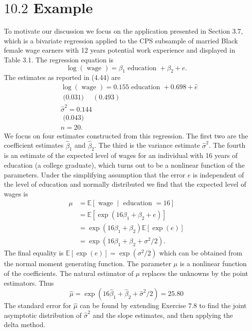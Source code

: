 \documentclass[10pt]{article}
\begin{document}
\section{$10.2$ Example}
To motivate our discussion we focus on the application presented in Section 3.7, which is a bivariate regression applied to the CPS subsample of married Black female wage earners with 12 years potential work experience and displayed in Table 3.1. The regression equation is
$$
\log (\text { wage })=\beta_{1} \text { education }+\beta_{2}+e .
$$
The estimates as reported in (4.44) are
$$
\begin{aligned}
& \log (\text { wage })=0.155 \text { education }+0.698+\widehat{e} \\
& \text { (0.031) } \quad(0.493) \\
& \widehat{\sigma}^{2}=0.144 \\
& \text { (0.043) } \\
& n=20 \text {. }
\end{aligned}
$$
We focus on four estimates constructed from this regression. The first two are the coefficient estimates $\widehat{\beta}_{1}$ and $\widehat{\beta}_{2}$. The third is the variance estimate $\widehat{\sigma}^{2}$. The fourth is an estimate of the expected level of wages for an individual with 16 years of education (a college graduate), which turns out to be a nonlinear function of the parameters. Under the simplifying assumption that the error $e$ is independent of the level of education and normally distributed we find that the expected level of wages is
$$
\begin{aligned}
\mu &=\mathbb{E}[\text { wage } \mid \text { education }=16] \\
&=\mathbb{E}\left[\exp \left(16 \beta_{1}+\beta_{2}+e\right)\right] \\
&=\exp \left(16 \beta_{1}+\beta_{2}\right) \mathbb{E}[\exp (e)] \\
&=\exp \left(16 \beta_{1}+\beta_{2}+\sigma^{2} / 2\right) .
\end{aligned}
$$
The final equality is $\mathbb{E}[\exp (e)]=\exp \left(\sigma^{2} / 2\right)$ which can be obtained from the normal moment generating function. The parameter $\mu$ is a nonlinear function of the coefficients. The natural estimator of $\mu$ replaces the unknowns by the point estimators. Thus
$$
\widehat{\mu}=\exp \left(16 \widehat{\beta}_{1}+\widehat{\beta}_{2}+\widehat{\sigma}^{2} / 2\right)=25.80
$$
The standard error for $\widehat{\mu}$ can be found by extending Exercise $7.8$ to find the joint asymptotic distribution of $\widehat{\sigma}^{2}$ and the slope estimates, and then applying the delta method.
\end{document}
